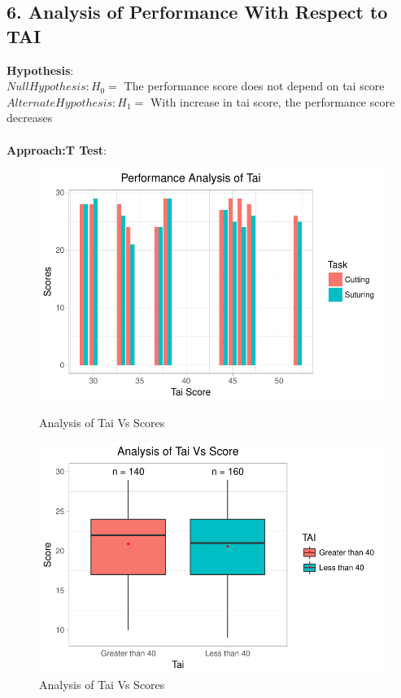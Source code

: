 \documentclass[12pt,epsf]{report}
\begin{document}
\subsection*{6. Analysis of Performance With Respect to  TAI}
\textbf{Hypothesis}:\\
$Null Hypothesis : H_0 = $ The performance score does not depend on tai score\\
$Alternate Hypothesis : H_1 = $ With increase in tai score, the performance score decreases\\
\\
\textbf{Approach:T Test}:\\
\begin{figure}[!htb]
	\begin{minipage}[c]{0.5\linewidth}
	\includegraphics[width=\linewidth]{TaiVsScores.pdf}
	\caption{ Analysis of Tai Vs Scores}
	\end{minipage}
	\hfill
	\begin{minipage}[c]{0.5\linewidth}
	\includegraphics[width=\linewidth]{TaiVsScores_Box.pdf}
	\caption{Analysis of Tai Vs Scores}
	\end{minipage}
\end{figure}\\
\end{document}
